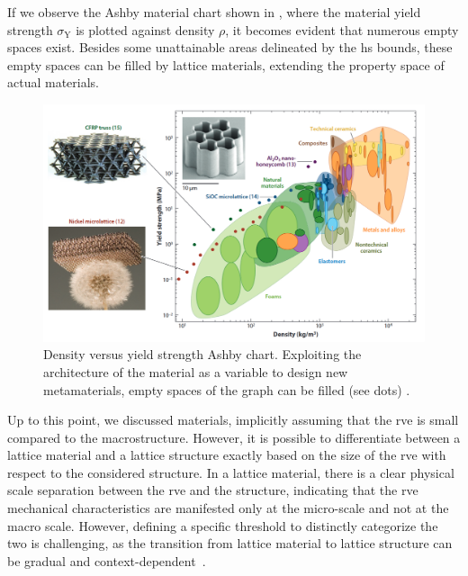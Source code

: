 If we observe the Ashby material chart shown in , where the material yield strength $\sigma_\text{Y}$ is plotted against density $\rho$, it becomes evident that numerous empty spaces exist. Besides some unattainable areas delineated by the \gls{hs} bounds, these empty spaces can be filled by lattice materials, extending the property space of actual materials.
\begin{figure}
    \centering
    \includegraphics[width=\linewidth]{figures/02_literature/ashby_chart.png}
    \caption{Density versus yield strength Ashby chart. Exploiting the architecture of the material as a variable to design new metamaterials, empty spaces of the graph can be filled (see dots) \cite{schaedler_architected_2016}.}
    \label{fig:02_ashby_ch}
\end{figure}

Up to this point, we discussed materials, implicitly assuming that the \gls{rve} is small compared to the macrostructure. However, it is possible to differentiate between a lattice material and a lattice structure exactly based on the size of the \gls{rve} with respect to the considered structure. In a lattice material, there is a clear physical scale separation between the \gls{rve} and the structure, indicating that the \gls{rve} mechanical characteristics are manifested only at the micro-scale and not at the macro scale. However, defining a specific threshold to distinctly categorize the two is challenging, as the transition from lattice material to lattice structure can be gradual and context-dependent~.

